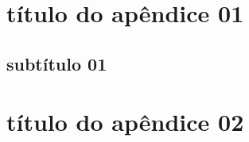 \chapter{título do apêndice 01}\label{ap01}

\section{subtítulo 01}\label{subap01}

\chapter{título do apêndice 02}\label{ap02}